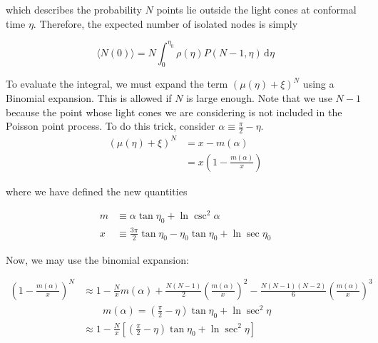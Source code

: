 \documentclass[12pt]{article}
\begin{document}
which describes the probability $N$ points lie outside the light cones at conformal time $\eta$.  Therefore, the expected number of isolated nodes is simply

\begin{equation}
\langle N\left(0\right)\rangle = N\int_0^{\eta_0} \! \rho\left(\eta\right)P\left(N-1\comma\eta\right) \, \mathrm d\eta
\end{equation}

To evaluate the integral, we must expand the term $\left(\mu\left(\eta\right)+\xi\right)^N$ using a Binomial expansion.  This is allowed if $N$ is large enough.  Note that we use $N-1$ because the point whose light cones we are considering is not included in the Poisson point process.  To do this trick, consider $\alpha \equiv \frac{\pi}{2} - \eta$.  
\begin{equation}
\begin{split}
\left(\mu\left(\eta\right) + \xi\right)^N &= x - m\left(\alpha\right) \\
  &= x\left(1-\frac{m\left(\alpha\right)}{x}\right)
\end{split}
\end{equation}

where we have defined the new quantities

\begin{equation}
\begin{split}
m & \equiv \alpha\tan\eta_0 + \ln\csc^2\alpha \\
x & \equiv \frac{3\pi}{2}\tan\eta_0 - \eta_0\tan\eta_0 + \ln\sec\eta_0
\end{split}
\end{equation}

Now, we may use the binomial expansion:

\begin{equation}
\begin{split}
\left(1-\frac{m\left(\alpha\right)}{x}\right)^N &\approx 1 - \frac{N}{x}m\left(\alpha\right) + \frac{N\left(N-1\right)}{2}\left(\frac{m\left(\alpha\right)}{x}\right)^2 - \frac{N\left(N-1\right)\left(N-2\right)}{6}\left(\frac{m\left(\alpha\right)}{x}\right)^3 \\
  & \qquad m\left(\alpha\right) = \left(\frac{\pi}{2} - \eta\right)\tan\eta_0 + \ln\sec^2\eta \\
  & \approx 1 - \frac{N}{x}\left[\left(\frac{\pi}{2} - \eta\right)\tan\eta_0 + \ln\sec^2\eta\right]
\end{split}
\end{equation}
\end{document}
